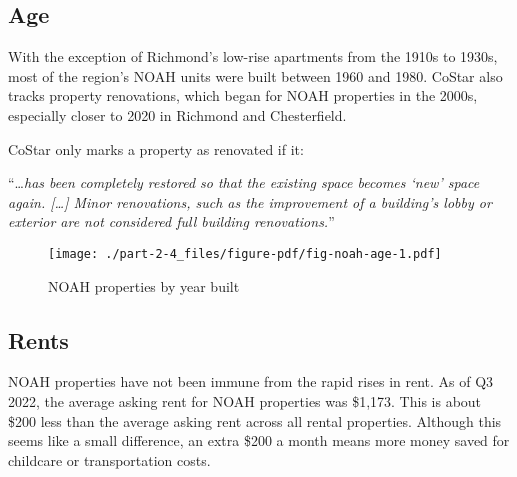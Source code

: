 \documentclass[
  letterpaper,
  DIV=11,
  numbers=noendperiod]{scrreprt}
\begin{document}
\hypertarget{age}{%
\subsection{Age}\label{age}}

With the exception of Richmond's low-rise apartments from the 1910s to
1930s, most of the region's NOAH units were built between 1960 and 1980.
CoStar also tracks property renovations, which began for NOAH properties
in the 2000s, especially closer to 2020 in Richmond and Chesterfield.

\begin{tcolorbox}[enhanced jigsaw, colframe=quarto-callout-tip-color-frame, arc=.35mm, bottomrule=.15mm, colbacktitle=quarto-callout-tip-color!10!white, opacityback=0, left=2mm, rightrule=.15mm, title=\textcolor{quarto-callout-tip-color}{\faLightbulb}\hspace{0.5em}{Substantial versus minor renovations}, colback=white, coltitle=black, toptitle=1mm, leftrule=.75mm, titlerule=0mm, breakable, opacitybacktitle=0.6, toprule=.15mm, bottomtitle=1mm]

CoStar only marks a property as renovated if it:

``\ldots{}\emph{has been completely restored so that the existing space
becomes `new' space again. {[}\ldots{]} Minor renovations, such as the
improvement of a building's lobby or exterior are not considered full
building renovations.}''

\end{tcolorbox}

\begin{figure}

{\centering \texttt{[image: ./part-2-4\_files/figure-pdf/fig-noah-age-1.pdf]}

}

\caption{\label{fig-noah-age}NOAH properties by year built}

\end{figure}

\hypertarget{rents}{%
\subsection{Rents}\label{rents}}

NOAH properties have not been immune from the rapid rises in rent. As of
Q3 2022, the average asking rent for NOAH properties was \$1,173. This
is about \$200 less than the average asking rent across all rental
properties. Although this seems like a small difference, an extra \$200
a month means more money saved for childcare or transportation costs.
\end{document}
